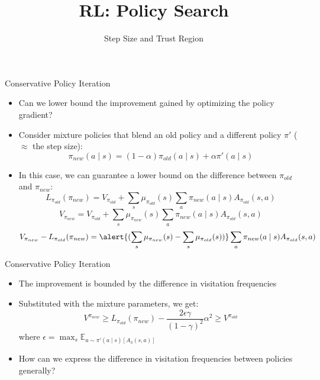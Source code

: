 \documentclass[aspectratio=169]{../latex_main/tntbeamer}  %
\title[RL: Policy Gradient]{RL: Policy Search}
\subtitle{Step Size and Trust Region}
\begin{document}
	
	\maketitle

\begin{frame}[c]{Conservative Policy Iteration}
	
    \begin{itemize}
        \item Can we lower bound the improvement gained by optimizing the policy gradient?
        \item Consider mixture policies that blend an old policy and a different policy $\pi'$ ($\approx$ the step size):
        $$\pi_{new}(a \mid s) = (1 - \alpha) \pi_{old} (a \mid s) + \alpha \pi'(a \mid s) $$
        \item In this case, we can guarantee a lower bound on the difference between $\pi_{old}$ and $\pi_{new}$:
        $$ L_{\pi_{old}}(\pi_{new}) = V_{{\pi_{old}}} + \sum_{s} \mu_{\pi_{old}} (s) \sum_{a} \pi_{new}(a \mid s) A_{\pi_{old}}(s,a)$$
        $$ V_{\pi_{new}} = V_{{\pi_{old}}} + \sum_{s} \mu_{\pi_{new}} (s) \sum_{a} \pi_{new}(a \mid s) A_{\pi_{old}}(s,a)$$
        $$ V_{\pi_{new}} - L_{\pi_{old}}(\pi_{new}) = \alert{(\sum_{s} \mu_{\pi_{new}}(s) - \sum_{s} \mu_{\pi_{old}} (s))} \sum_{a} \pi_{new}(a \mid s) A_{\pi_{old}}(s,a)$$
    \end{itemize}

\end{frame}
\begin{frame}[c]{Conservative Policy Iteration}
	
    \begin{itemize}
        \item The improvement is bounded by the difference in visitation frequencies
        \item Substituted with the mixture parameters, we get:
        $$V^{\pi_{new}} \geq L_{\pi_{old}} (\pi_{new}) - \frac{2\epsilon\gamma}{(1- \gamma)^2} \alpha^2 \geq V^{\pi_{old}}$$
        where $\epsilon = \max_{s} \mathbb{E}_{a \sim \pi'(a \mid s) [A_\pi(s,a)]}$
        \item How can we express the difference in visitation frequencies between policies generally?
    \end{itemize}

\end{frame}
\end{document}
